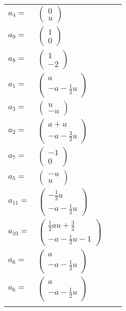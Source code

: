 \documentclass[1p]{elsarticle_modified}
\theoremstyle{definition}
\begin{document}
\begin{tabular}{m{7pt} m{180pt} m{7pt} m{180pt} }
\flushright $a_{4}=$&$\begin{pmatrix}0\\u\end{pmatrix}$ \\
\flushright $a_{9}=$&$\begin{pmatrix}1\\0\end{pmatrix}$ \\
\flushright $a_{8}=$&$\begin{pmatrix}1\\-2\end{pmatrix}$ \\
\flushright $a_{1}=$&$\begin{pmatrix}a\\- a-\frac{1}{2} u\end{pmatrix}$ \\
\flushright $a_{3}=$&$\begin{pmatrix}u\\- u\end{pmatrix}$ \\
\flushright $a_{2}=$&$\begin{pmatrix}a+u\\- a-\frac{3}{2} u\end{pmatrix}$ \\
\flushright $a_{7}=$&$\begin{pmatrix}-1\\0\end{pmatrix}$ \\
\flushright $a_{5}=$&$\begin{pmatrix}- u\\u\end{pmatrix}$ \\
\flushright $a_{11}=$&$\begin{pmatrix}-\frac{1}{2} u\\- a-\frac{1}{2} u\end{pmatrix}$ \\
\flushright $a_{10}=$&$\begin{pmatrix}\frac{1}{2} a u+\frac{3}{2}\\- a-\frac{1}{2} u-1\end{pmatrix}$ \\
\flushright $a_{6}=$&$\begin{pmatrix}a\\- a-\frac{1}{2} u\end{pmatrix}$\\ \flushright $a_{6}=$&$\begin{pmatrix}a\\- a-\frac{1}{2} u\end{pmatrix}$\\&\end{tabular}
\end{document}
